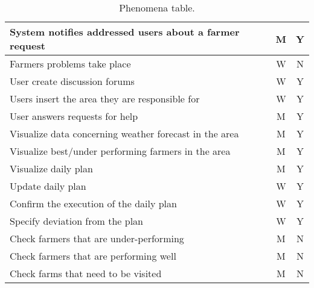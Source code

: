 \begin{table}[H]
\begin{tabular}{|l|c|c|}
        \hline
        System notifies addressed users about a farmer request          &   M   &   Y \\
        \hline
        Farmers problems take place                                     &   W   &   N \\
        \hline
        User create discussion forums                                   &   W   &   Y \\
        \hline
        Users insert the area they are responsible for                  &   W   &   Y \\
        \hline
        User answers requests for help                                  &   M   &   Y \\
        \hline
        Visualize data concerning weather forecast in the area          &   M   &   Y \\
        \hline
        Visualize best/under performing farmers in the area             &   M   &   Y \\
        \hline
        Visualize daily plan                                            &   M   &   Y \\
        \hline
        Update daily plan                                               &   W   &   Y \\
        \hline
        Confirm the execution of the daily plan                         &   W   &   Y \\
        \hline
        Specify deviation from the plan                                 &   W   &   Y \\
        \hline
        Check farmers that are under-performing                         &   M   &   N \\
        \hline
        Check farmers that are performing well                          &   M   &   N \\
        \hline
        Check farms that need to be visited                             &   M   &   N \\
        \hline
    \end{tabular}
    
    \caption{\label{tab:phenomena_table}Phenomena table.}
    
\end{table}
\newpage
